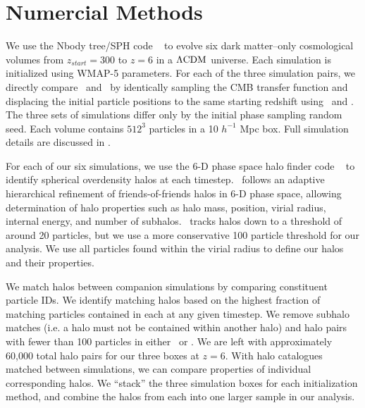 \section{Numercial Methods}
\label{sec:methods}


We use the Nbody tree/SPH code \gadgettwo\ \citep{2001NewA....6...79S, 2005MNRAS.364.1105S} to evolve six dark matter--only cosmological volumes from $z_{start} = 300$ to $z = 6$ in a $\rm \Lambda CDM$ universe.  Each simulation is initialized using WMAP-5 parameters.  For each of the three simulation pairs, we directly compare \lpt\ and \za\ by identically sampling the CMB transfer function and displacing the initial particle positions to the same starting redshift using \lpt\ and \za.  The three sets of simulations differ only by the initial phase sampling random seed.  Each volume contains $512^{3}$ particles in a 10 $h^{-1}$ Mpc box.  Full simulation details are discussed in \citet{2012ApJ...761L...8H}.

For each of our six simulations, we use the 6-D phase space halo finder code \rockstar\ \citep{2013ApJ...762..109B} to identify spherical overdensity halos at each timestep.  \rockstar\ follows an adaptive hierarchical refinement of friends-of-friends halos in 6-D phase space, allowing determination of halo properties such as halo mass, position, virial radius, internal energy, and number of subhalos.  \rockstar\ tracks halos down to a threshold of around 20 particles, but we use a more conservative 100 particle threshold for our analysis.  We use all particles found within the virial radius to define our halos and their properties.

We match halos between companion simulations by comparing constituent particle IDs.  We identify matching halos based on the highest fraction of matching particles contained in each at any given timestep.  We remove subhalo matches (i.e. a halo must not be contained within another halo) and halo pairs with fewer than 100 particles in either \lpt\ or \za.  We are left with approximately 60,000 total halo pairs for our three boxes at $z = 6$.  With halo catalogues matched between simulations, we can compare properties of individual corresponding halos.  We ``stack'' the three simulation boxes for each initialization method, and combine the halos from each into one larger sample in our analysis.

